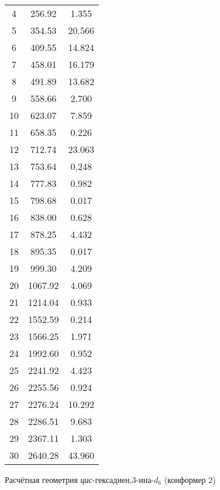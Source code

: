 {\begin{center}
\begin{tabular}{ccc}
     4 &  256.92 &     1.355 \\
     5 &  354.53 &   20.566 \\
     6 &  409.55 &    14.824 \\
     7 &  458.01 &    16.179 \\
     8 &  491.89 &    13.682 \\
     9 &  558.66 &     2.700 \\
    10 &  623.07 &     7.859 \\
    11 &  658.35 &     0.226 \\
   12 &  712.74 &    23.063 \\
    13 &  753.64 &    0.248 \\
    14 &  777.83 &     0.982 \\
    15 &  798.68 &    0.017 \\
    16 &  838.00 &     0.628 \\
    17 &  878.25 &     4.432 \\
    18 &  895.35 &     0.017 \\
    19 &  999.30 &     4.209 \\
    20 & 1067.92 &     4.069 \\
    21 & 1214.04 &     0.933 \\
    22 & 1552.59 &     0.214 \\
    23 & 1566.25 &     1.971 \\
    24 & 1992.60 &     0.952 \\
    25 & 2241.92 &     4.423 \\
    26 & 2255.56 &     0.924 \\
    27 & 2276.24 &    10.292 \\
    28 & 2286.51 &     9.683 \\
    29 & 2367.11 &    1.303 \\
    30 & 2640.28 &   43.960 \\
 \end{tabular}
\end{center}
\newpage
Расчётная геометрия {\itshape цис}-гексадиен,3\nobreakdash-ина-$d_6$ (конформер 2)

}
